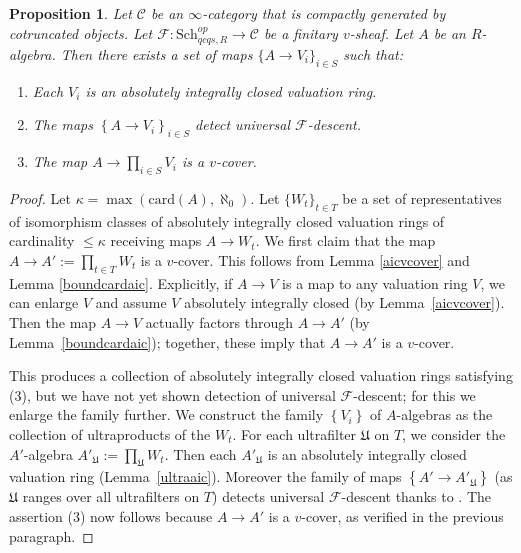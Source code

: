 \documentclass[reqno]{amsart}
\newcommand{\sF}{\mathcal{F}}
\newtheorem{proposition}[theorem]{Proposition}
\theoremstyle{definition}
\begin{document}
\begin{proposition} 
\label{vcoverbyvaluation}
Let $\mathcal{C}$ be an $\infty$-category that is compactly generated by cotruncated objects. 
Let $\mathcal{F}\colon  \mathrm{Sch}_{qcqs,R}^{op} \to \mathcal{C}$ be a finitary $v$-sheaf. Let $A$ be an $R$-algebra. Then there exists a set of maps $\{A \to V_i\}_{i \in S}$
such that: 
\begin{enumerate}
\item Each $V_i$ is an absolutely integrally closed valuation ring.  
\item The maps $\left\{A \to V_i\right\}_{i \in S}$ detect universal $\mathcal{F}$-descent. 
\item The map $A \to \prod_{i \in S} V_i$ is a $v$-cover. 
\end{enumerate}
\end{proposition} 
\begin{proof} 
Let $\kappa
= \max( \mathrm{card}(A), \aleph_0)$. 
Let $\{W_t\}_{t \in T}$ be  a set of representatives of isomorphism classes of absolutely integrally closed
valuation rings of cardinality $\leq \kappa$ receiving maps $A \to W_t$. 
We first claim that the map $A \to A' :=\prod_{t \in T} W_t$ is a $v$-cover. 
This follows from Lemma \ref{aicvcover} and Lemma \ref{boundcardaic}. 
Explicitly, if $A \to V$ is a map to any valuation ring $V$, we can enlarge $V$
and assume $V$ absolutely integrally closed (by Lemma~\ref{aicvcover}). Then the map $A \to V$
actually factors through $A \to A'$ (by Lemma~\ref{boundcardaic});
together, these imply that $A\to A'$ is a $v$-cover. 

This produces a collection of absolutely integrally closed valuation rings satisfying (3), but we have not yet shown
detection of universal $\sF$-descent; for this we enlarge the family further. 
We construct the family $\left\{V_i\right\}$ of $A$-algebras as the
collection of ultraproducts of the $W_t$. 
For each ultrafilter $\mathfrak{U}$ on $T$, we consider the $A'$-algebra
$A'_{\mathfrak{U}} := \prod_{\mathfrak{U}} W_t$. Then each $A'_{\mathfrak{U}}$
is an absolutely integrally closed valuation ring (Lemma~\ref{ultraaic}). Moreover the family of
maps $\left\{A' \to A'_{\mathfrak{U}}\right\}$ (as $\mathfrak{U}$ ranges
over all ultrafilters on $T$) detects universal $\mathcal{F}$-descent
thanks to . 
The assertion (3) now follows because $A \to A'$ is a $v$-cover,
as verified in the previous paragraph. 
\end{proof} 
\end{document}
